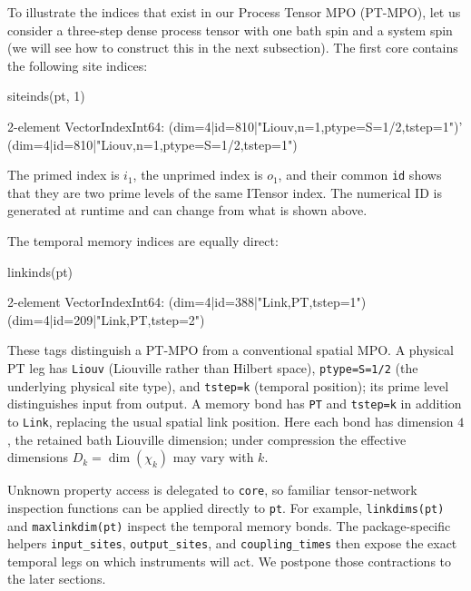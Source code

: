 To illustrate the indices that exist in our Process Tensor MPO (PT-MPO), let us consider a three-step dense process tensor with one bath spin and a system spin (we will see how to construct this in the next subsection).
The first core contains the following site indices:
%
\begin{julialistingpair}[
    caption={Site indices of the first PT-MPO core.}, label={lst:pt-anatomy-siteinds},
    ]
%
    \begin{juliacode}[paired]
siteinds(pt, 1)
    \end{juliacode}
%
    \begin{juliaoutput}[paired]
2-element Vector{Index{Int64}}:
 (dim=4|id=810|"Liouv,n=1,ptype=S=1/2,tstep=1")'
 (dim=4|id=810|"Liouv,n=1,ptype=S=1/2,tstep=1")
    \end{juliaoutput}
%
\end{julialistingpair}
%
The primed index is \(i_1\), the unprimed index is \(o_1\), and their common \texttt{id} shows that they are two prime levels of the same ITensor index.
The numerical ID is generated at runtime and can change from what is shown above.

The temporal memory indices are equally direct:
%
\begin{julialistingpair}[
    caption={Memory-link indices of the three-step process tensor.}, label={lst:pt-anatomy-linkinds},
    ]
%
    \begin{juliacode}[paired]
linkinds(pt)
    \end{juliacode}
%
    \begin{juliaoutput}[paired]
2-element Vector{Index{Int64}}:
 (dim=4|id=388|"Link,PT,tstep=1")
 (dim=4|id=209|"Link,PT,tstep=2")
    \end{juliaoutput}
%
\end{julialistingpair}
%
These tags distinguish a PT-MPO from a conventional spatial MPO.
A physical PT leg has \texttt{Liouv} (Liouville rather than Hilbert space), \texttt{ptype=S=1/2} (the underlying physical site type), and \texttt{tstep=k} (temporal position); its prime level distinguishes input from output.
A memory bond has \texttt{PT} and \texttt{tstep=k} in addition to \texttt{Link}, replacing the usual spatial link position.
Here each bond has dimension \(4\), the retained bath Liouville dimension; under compression the effective dimensions \(D_k=\dim(\chi_k)\) may vary with \(k\).

Unknown property access is delegated to \texttt{core}, so familiar tensor-network inspection functions can be applied directly to \texttt{pt}.
For example, \texttt{linkdims(pt)} and \texttt{maxlinkdim(pt)} inspect the temporal memory bonds.
The package-specific helpers \texttt{input\_sites}, \texttt{output\_sites}, and \texttt{coupling\_times} then expose the exact temporal legs on which instruments will act.
We postpone those contractions to the later sections.

